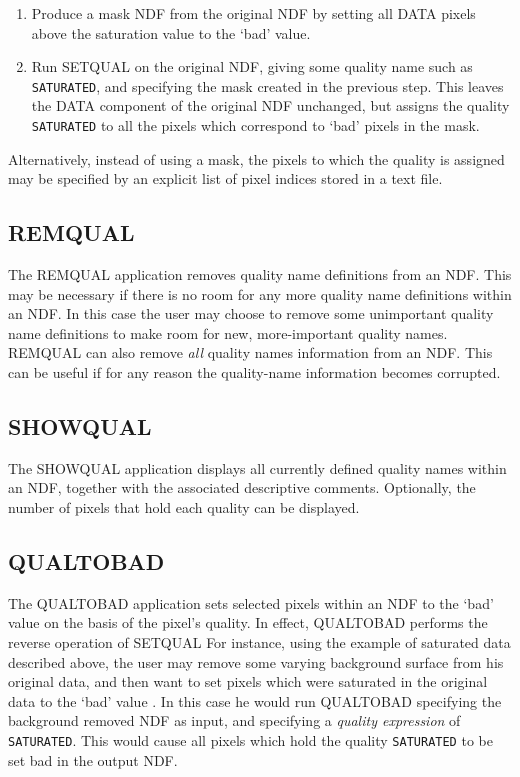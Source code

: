 \documentclass[twoside,11pt]{article}
\newcommand{\xref}[3]{#1}
\renewcommand{\_}{\texttt{\symbol{95}}}
\begin{document}
\begin{enumerate}

\item Produce a mask NDF from the original NDF by setting all DATA pixels 
above the saturation value to the `bad' value. 

\item Run SETQUAL on the original NDF, giving some quality name such as
{\tt SATURATED}, and specifying the mask created in the previous step. This
leaves the DATA component of the original NDF unchanged, but assigns the
quality {\tt SATURATED} to all the pixels which correspond to `bad'
pixels in the mask.  

\end{enumerate}

Alternatively, instead of using a mask, the pixels to which the quality is
assigned may be specified by an explicit list of pixel indices stored in a
text file.

\subsection{REMQUAL}

The \xref{REMQUAL}{sun95}{REMQUAL} application removes quality name
definitions from an NDF. This may be necessary if there is no room for
any more quality name definitions within an NDF. In this case the user
may choose to remove some unimportant quality name definitions to make
room for new, more-important quality names. REMQUAL can also remove {\em
all} quality names information from an NDF. This can be useful if for any
reason the quality-name information becomes corrupted. 

\subsection{SHOWQUAL}
The \xref{SHOWQUAL}{sun95}{SHOWQUAL} application displays all currently
defined quality names within an NDF, together with the associated
descriptive comments. Optionally, the number of pixels that hold each
quality can be displayed.

\subsection{QUALTOBAD}

The \xref{QUALTOBAD}{sun95}{QUALTOBAD} application sets selected
pixels within an NDF to the `bad' value on the basis of the pixel's
quality. In effect, QUALTOBAD performs the reverse operation of 
\xref{SETQUAL}{SETQUAL}. For instance, using the example of saturated
data described above, the user may remove some varying background surface
from his original data, and then want to set pixels which were saturated
in the original data to the `bad' value . In this case he would run
QUALTOBAD specifying the background removed NDF as input, and specifying
a {\em quality expression} of {\tt SATURATED}. This would cause all pixels
which hold the quality {\tt SATURATED} to be set bad in the output NDF. 
\end{document}
